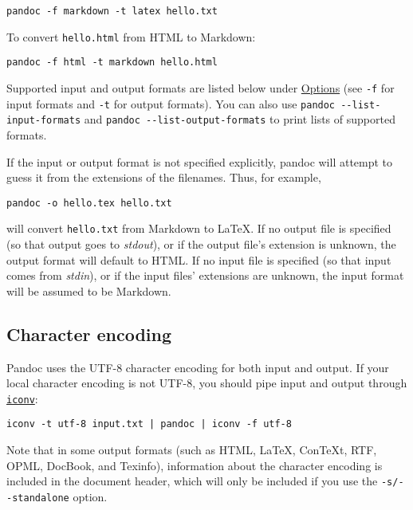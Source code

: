 \documentclass[
]{article}
\begin{document}
\begin{verbatim}
pandoc -f markdown -t latex hello.txt
\end{verbatim}

To convert \texttt{hello.html} from HTML to Markdown:

\begin{verbatim}
pandoc -f html -t markdown hello.html
\end{verbatim}

Supported input and output formats are listed below under
\protect\hyperlink{options}{Options} (see \texttt{-f} for input formats
and \texttt{-t} for output formats). You can also use
\texttt{pandoc\ -\/-list-input-formats} and
\texttt{pandoc\ -\/-list-output-formats} to print lists of supported
formats.

If the input or output format is not specified explicitly, pandoc will
attempt to guess it from the extensions of the filenames. Thus, for
example,

\begin{verbatim}
pandoc -o hello.tex hello.txt
\end{verbatim}

will convert \texttt{hello.txt} from Markdown to LaTeX. If no output
file is specified (so that output goes to \emph{stdout}), or if the
output file's extension is unknown, the output format will default to
HTML. If no input file is specified (so that input comes from
\emph{stdin}), or if the input files' extensions are unknown, the input
format will be assumed to be Markdown.

\hypertarget{character-encoding}{%
\subsection{Character encoding}\label{character-encoding}}

Pandoc uses the UTF-8 character encoding for both input and output. If
your local character encoding is not UTF-8, you should pipe input and
output through
\href{https://www.gnu.org/software/libiconv/}{\texttt{iconv}}:

\begin{verbatim}
iconv -t utf-8 input.txt | pandoc | iconv -f utf-8
\end{verbatim}

Note that in some output formats (such as HTML, LaTeX, ConTeXt, RTF,
OPML, DocBook, and Texinfo), information about the character encoding is
included in the document header, which will only be included if you use
the \texttt{-s/-\/-standalone} option.
\end{document}
